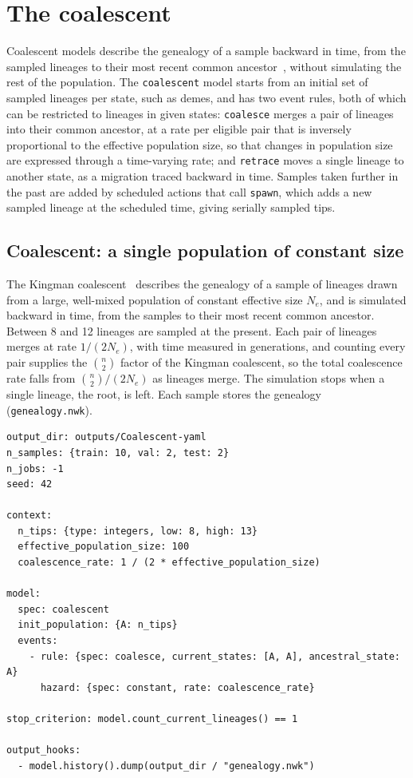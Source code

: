\documentclass[11pt]{article}
\begin{document}
\section{The coalescent}
\label{sec:coalescent-models}

Coalescent models describe the genealogy of a sample backward in time, from the
sampled lineages to their most recent common
ancestor~\citep{kingman1982coalescent}, without simulating the rest of the
population. The \texttt{coalescent} model starts from an initial set of sampled
lineages per state, such as demes, and has two event rules, both of which can be
restricted to lineages in given states: \texttt{coalesce} merges a pair of
lineages into their common ancestor, at a rate per eligible pair that is
inversely proportional to the effective population size, so that changes in
population size are expressed through a time-varying rate; and \texttt{retrace}
moves a single lineage to another state, as a migration traced backward in time.
Samples taken further in the past are added by scheduled actions that call
\texttt{spawn}, which adds a new sampled lineage at the scheduled time, giving
serially sampled tips.

\subsection{Coalescent: a single population of constant size}
\label{ex:coalescent}

The Kingman coalescent~\citep{kingman1982coalescent} describes the genealogy of
a sample of lineages drawn from a large, well-mixed population of constant
effective size $N_e$, and is simulated backward in time, from the samples to
their most recent common ancestor. Between 8 and 12 lineages are sampled at the
present. Each pair of lineages merges at rate $1/(2N_e)$, with time measured in
generations, and counting every pair supplies the $\binom{n}{2}$ factor of the
Kingman coalescent, so the total coalescence rate falls from
$\binom{n}{2}/(2N_e)$ as lineages merge. The simulation stops when a single
lineage, the root, is left. Each sample stores the genealogy
(\texttt{genealogy.nwk}).

\begin{lstlisting}[style=cfg]
output_dir: outputs/Coalescent-yaml
n_samples: {train: 10, val: 2, test: 2}
n_jobs: -1
seed: 42

context:
  n_tips: {type: integers, low: 8, high: 13}
  effective_population_size: 100
  coalescence_rate: 1 / (2 * effective_population_size)

model:
  spec: coalescent
  init_population: {A: n_tips}
  events:
    - rule: {spec: coalesce, current_states: [A, A], ancestral_state: A}
      hazard: {spec: constant, rate: coalescence_rate}

stop_criterion: model.count_current_lineages() == 1

output_hooks:
  - model.history().dump(output_dir / "genealogy.nwk")
\end{lstlisting}
\end{document}
